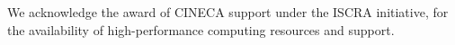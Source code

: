 \begin{acknowledgement}
  We acknowledge the award of CINECA support under the ISCRA
  initiative, for the availability of high-performance computing
  resources and support.
\end{acknowledgement}





